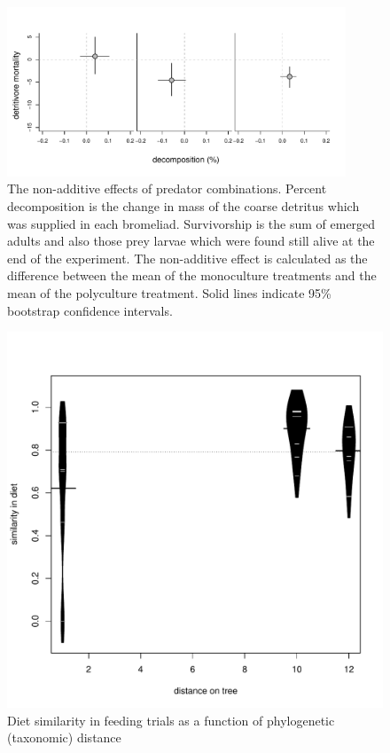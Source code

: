 \documentclass[10pt]{article}
\begin{document}
\begin{spacing}{2}
\begin{figure}
  \centering
  \includegraphics[width=0.9\textwidth]{../figures/bivar.pdf}
  \caption{The non-additive effects of predator combinations. Percent
    decomposition is the change in mass of the coarse detritus which
    was supplied in each bromeliad.  Survivorship is the sum of
    emerged adults and also those prey larvae which were found still
    alive at the end of the experiment.  The non-additive effect is
    calculated as the difference between the mean of the monoculture
    treatments and the mean of the polyculture treatment. Solid lines
    indicate 95\% bootstrap confidence intervals.}
\label{fig:prednonadd}
\end{figure}

\begin{figure}
  \centering
  \includegraphics{../figures/dietSimilarityDistance.pdf}
  \caption{Diet similarity in feeding trials as a function of
    phylogenetic (taxonomic) distance}
\label{fig:dietsim}
\end{figure}



\end{spacing}
\end{document}
